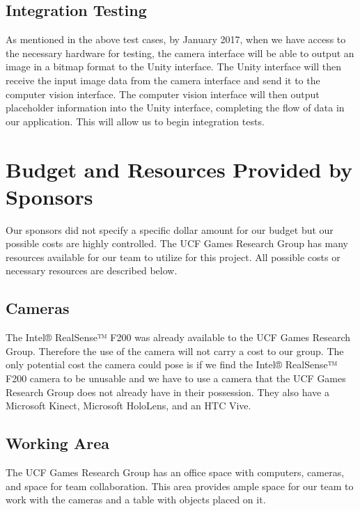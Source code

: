 \documentclass[12pt]{article}
\begin{document}
\subsection{Integration Testing}\label{integration-testing}

As mentioned in the above test cases, by January 2017, when we have
access to the necessary hardware for testing, the camera interface will
be able to output an image in a bitmap format to the Unity interface.
The Unity interface will then receive the input image data from the
camera interface and send it to the computer vision interface. The
computer vision interface will then output placeholder information into
the Unity interface, completing the flow of data in our application.
This will allow us to begin integration tests.

\section{Budget and Resources Provided by
Sponsors}\label{budget-and-resources-provided-by-sponsors}

Our sponsors did not specify a specific dollar amount for our budget but
our possible costs are highly controlled. The UCF Games Research Group
has many resources available for our team to utilize for this project.
All possible costs or necessary resources are described below.

\subsection{Cameras}\label{cameras}

The Intel® RealSense™ F200 was already available to the UCF Games
Research Group. Therefore the use of the camera will not carry a cost to
our group. The only potential cost the camera could pose is if we find
the Intel® RealSense™ F200 camera to be unusable and we have to use a
camera that the UCF Games Research Group does not already have in their
possession. They also have a Microsoft Kinect, Microsoft HoloLens, and
an HTC Vive.

\subsection{Working Area}\label{working-area}

The UCF Games Research Group has an office space with computers,
cameras, and space for team collaboration. This area provides ample
space for our team to work with the cameras and a table with objects
placed on it.
\end{document}
